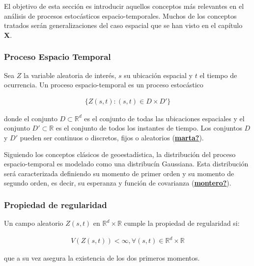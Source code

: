 \documentclass[
]{book}
\begin{document}
El objetivo de esta sección es introducir aquellos conceptos más relevantes en el análisis de procesos estocásticos espacio-temporales. Muchos de los conceptos tratados serán generalizaciones del caso espacial que se han visto en el capítulo \textbf{X}.

\hypertarget{proceso-espacio-temporal-1}{%
\subsubsection*{Proceso Espacio Temporal}\label{proceso-espacio-temporal-1}}

Sea \(Z\) la variable aleatoria de interés, \(s\) su ubicación espacial y \(t\) el tiempo de ocurrencia. Un proceso espacio-temporal es un proceso estocástico

\begin{align}
  \{Z(s,t):(s,t) \in D \times D' \}
\end{align}

donde el conjunto \(D \subset \mathbb{R}^d\) es el conjunto de todas las ubicaciones espaciales y el conjunto \(D' \subset \mathbb{R}\) es el conjunto de todos los instantes de tiempo. Los conjuntos \(D\) y \(D'\) pueden ser continuos o discretos, fijos o aleatorios (\protect\hyperlink{ref-marta}{\textbf{marta?}}).

Siguiendo los conceptos clásicos de geoestadística, la distribución del proceso espacio-temporal es modelado como una distribucín Gaussiana. Esta distribución será caracterizada definiendo su momento de primer orden y su momento de segundo orden, es decir, su esperanza y función de covarianza (\protect\hyperlink{ref-montero}{\textbf{montero?}}).

\hypertarget{propiedad-de-regularidad}{%
\subsubsection*{Propiedad de regularidad}\label{propiedad-de-regularidad}}

Un campo aleatorio \(Z(s,t)\) en \(\mathbb{R}^d\times \mathbb{R}\) cumple la propiedad de regularidad si:

\begin{align}
V(Z(s,t))<\infty, \forall (s,t) \in \mathbb{R}^d\times \mathbb{R}
\end{align}

que a su vez asegura la existencia de los dos primeros momentos.
\end{document}
